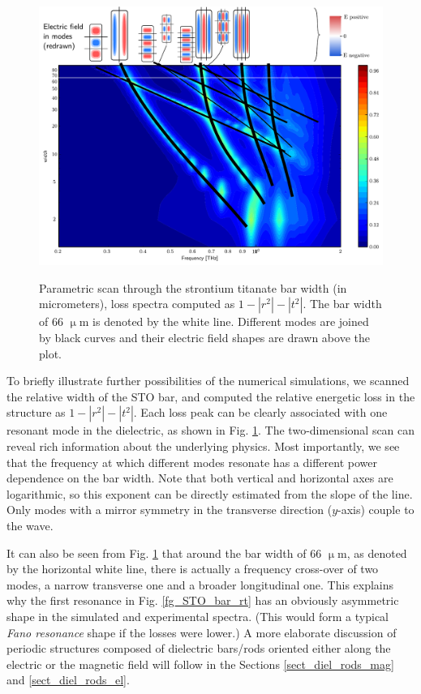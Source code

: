 \begin{figure}[ht] \centering \caption{Parametric scan through the strontium titanate bar width (in micrometers), loss spectra computed as $1-|r^2|-|t^2|$. The bar width of 66 $\upmu$m is denoted by the white line. Different modes are joined by black curves and their electric field shapes are drawn above the plot.} \includegraphics[width=\textwidth]{img/STOBarC_modes2.pdf} \label{fg_STO_bar_modes} \end{figure}
To briefly illustrate further possibilities of the numerical simulations, we scanned the relative width of the STO bar, and computed the relative energetic loss in the structure as $1-|r^2|-|t^2|$. Each loss peak can be clearly associated with one resonant mode in the dielectric, as shown in Fig. \ref{fg_STO_bar_modes}. The two-dimensional scan can reveal rich information about the underlying physics. Most importantly, we see that the frequency at which different modes resonate has a different power dependence on the bar width. Note that both vertical and horizontal axes are logarithmic, so this exponent can be directly estimated from the slope of the line. Only modes with a mirror symmetry in the transverse direction ($y$-axis) couple to the wave.

It can also be seen from Fig. \ref{fg_STO_bar_modes} that around the bar width of 66 $\upmu$m, as denoted by the horizontal white line, there is actually a frequency cross-over of two modes, a narrow transverse one and a broader longitudinal one. This explains why the first resonance in Fig. \ref{fg_STO_bar_rt} has an obviously asymmetric shape in the simulated and experimental spectra. (This would form a typical \textit{Fano resonance} shape if the losses were lower.)
A more elaborate discussion of periodic structures composed of dielectric bars/rods oriented either along the electric or the magnetic field will follow in the Sections \ref{sect_diel_rods_mag} and \ref{sect_diel_rods_el}.


